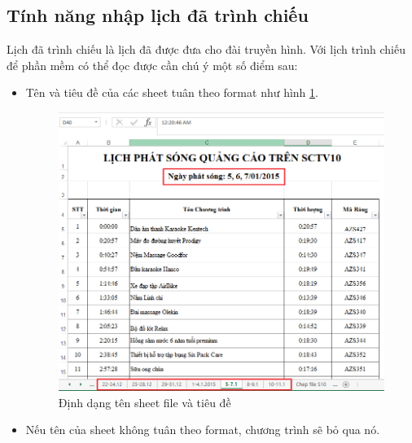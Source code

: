 \documentclass[11pt]{article}
\begin{document}
\subsection{Tính năng nhập lịch đã trình chiếu}
\indent Lịch đã trình chiếu là lịch đã được đưa cho đài truyền hình. Với lịch trình chiếu để phần mềm có thể đọc được cần chú ý một số điểm sau:
\begin{itemize}
	\item Tên và tiêu đề của các sheet tuân theo format như hình \ref{scheduleformat}.
	\begin{figure}[h!]
		\begin{center}
			\includegraphics[width=15cm]{scheduleformat.png}
		\end{center}
		\caption{Định dạng tên sheet file và tiêu đề}
		\label{scheduleformat}
	\end{figure}
	\item Nếu tên của sheet không tuân theo format, chương trình sẽ bỏ qua nó.
\end{itemize}
\end{document}

